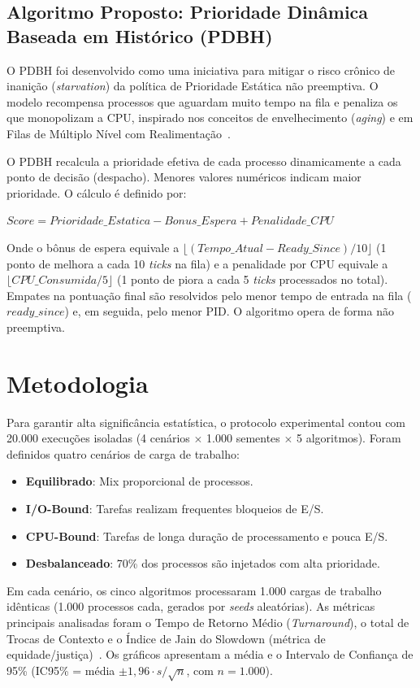 \documentclass[conference]{IEEEtran}
\begin{document}
\subsection{Algoritmo Proposto: Prioridade Dinâmica Baseada em Histórico (PDBH)}
O PDBH foi desenvolvido como uma iniciativa para mitigar o risco crônico de inanição (\textit{starvation}) da política de Prioridade Estática não preemptiva. O modelo recompensa processos que aguardam muito tempo na fila e penaliza os que monopolizam a CPU, inspirado nos conceitos de envelhecimento (\textit{aging}) e em Filas de Múltiplo Nível com Realimentação~\cite{tanenbaum, stallings}.

O PDBH recalcula a prioridade efetiva de cada processo dinamicamente a cada ponto de decisão (despacho). Menores valores numéricos indicam maior prioridade. O cálculo é definido por:

$Score = Prioridade\_Estatica - Bonus\_Espera + Penalidade\_CPU$

Onde o bônus de espera equivale a $\lfloor (Tempo\_Atual - Ready\_Since) / 10 \rfloor$ (1 ponto de melhora a cada 10 \textit{ticks} na fila) e a penalidade por CPU equivale a $\lfloor CPU\_Consumida / 5 \rfloor$ (1 ponto de piora a cada 5 \textit{ticks} processados no total). Empates na pontuação final são resolvidos pelo menor tempo de entrada na fila ($ready\_since$) e, em seguida, pelo menor PID. O algoritmo opera de forma não preemptiva.

\section{Metodologia}
Para garantir alta significância estatística, o protocolo experimental contou com 20.000 execuções isoladas (4 cenários $\times$ 1.000 sementes $\times$ 5 algoritmos). Foram definidos quatro cenários de carga de trabalho:
\begin{itemize}
    \item \textbf{Equilibrado}: Mix proporcional de processos.
    \item \textbf{I/O-Bound}: Tarefas realizam frequentes bloqueios de E/S.
    \item \textbf{CPU-Bound}: Tarefas de longa duração de processamento e pouca E/S.
    \item \textbf{Desbalanceado}: 70\% dos processos são injetados com alta prioridade.
\end{itemize}

Em cada cenário, os cinco algoritmos processaram 1.000 cargas de trabalho idênticas (1.000 processos cada, gerados por \textit{seeds} aleatórias). As métricas principais analisadas foram o Tempo de Retorno Médio (\textit{Turnaround}), o total de Trocas de Contexto e o Índice de Jain do Slowdown (métrica de equidade/justiça)~\cite{jain1984}. Os gráficos apresentam a média e o Intervalo de Confiança de 95\% (IC95\% = média $\pm 1{,}96 \cdot s/\sqrt{n}$, com $n = 1.000$).
\end{document}
